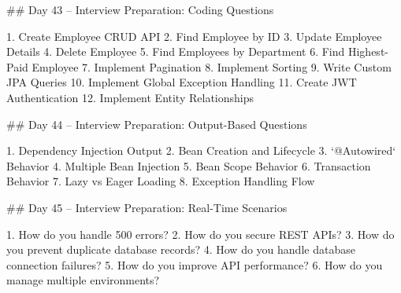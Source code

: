 ## Day 43 – Interview Preparation: Coding Questions

1. Create Employee CRUD API
2. Find Employee by ID
3. Update Employee Details
4. Delete Employee
5. Find Employees by Department
6. Find Highest-Paid Employee
7. Implement Pagination
8. Implement Sorting
9. Write Custom JPA Queries
10. Implement Global Exception Handling
11. Create JWT Authentication
12. Implement Entity Relationships

## Day 44 – Interview Preparation: Output-Based Questions

1. Dependency Injection Output
2. Bean Creation and Lifecycle
3. `@Autowired` Behavior
4. Multiple Bean Injection
5. Bean Scope Behavior
6. Transaction Behavior
7. Lazy vs Eager Loading
8. Exception Handling Flow

## Day 45 – Interview Preparation: Real-Time Scenarios

1. How do you handle 500 errors?
2. How do you secure REST APIs?
3. How do you prevent duplicate database records?
4. How do you handle database connection failures?
5. How do you improve API performance?
6. How do you manage multiple environments?
